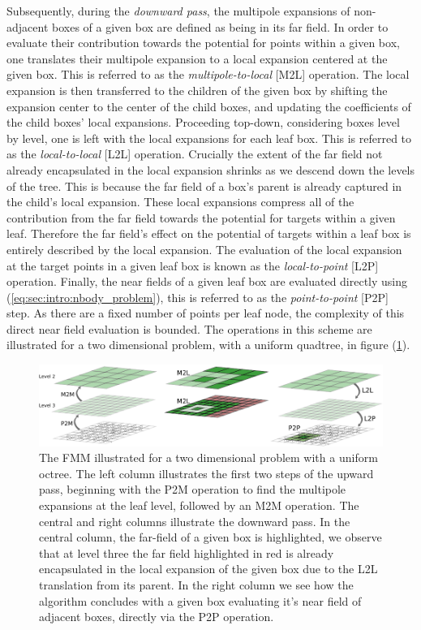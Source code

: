 \documentclass{IEEEcsmag}
\begin{document}
Subsequently, during the \textit{downward pass}, the multipole expansions of non-adjacent boxes of a given box are defined as being in its far field. In order to evaluate their contribution towards the potential for points within a given box, one translates their multipole expansion to a local expansion centered at the given box. This is referred to as the \textit{multipole-to-local} [M2L] operation. The local expansion is then transferred to the children of the given box by shifting the expansion center to the center of the child boxes, and updating the coefficients of the child boxes' local expansions. Proceeding top-down, considering boxes level by level, one is left with the local expansions for each leaf box. This is referred to as the \textit{local-to-local} [L2L] operation. Crucially the extent of the far field not already encapsulated in the local expansion shrinks as we descend down the levels of the tree. This is because the far field of a box's parent is already captured in the child's local expansion. These local expansions compress all of the contribution from the far field towards the potential for targets within a given leaf. Therefore the far field's effect on the potential of targets within a leaf box is entirely described by the local expansion. The evaluation of the local expansion at the target points in a given leaf box is known as the \textit{local-to-point} [L2P] operation. Finally, the near fields of a given leaf box are evaluated directly using (\ref{eq:sec:intro:nbody_problem}), this is referred to as the \textit{point-to-point} [P2P] step. As there are a fixed number of points per leaf node, the complexity of this direct near field evaluation is bounded. The operations in this scheme are illustrated for a two dimensional problem, with a uniform quadtree, in figure (\ref{fig:tree_traversal}).

\begin{figure}
\centerline{\includegraphics {figures/algorithm.pdf}}
\caption{The FMM illustrated for a two dimensional problem with a uniform octree. The left column illustrates the first two steps of the upward pass, beginning with the P2M operation to find the multipole expansions at the leaf level, followed by an M2M operation. The central and right columns illustrate the downward pass. In the central column, the far-field of a given box is highlighted, we observe that at level three the far field highlighted in red is already encapsulated in the local expansion of the given box due to the L2L translation from its parent. In the right column we see how the algorithm concludes with a given box evaluating it's near field of adjacent boxes, directly via the P2P operation.}
\label{fig:tree_traversal}
\end{figure}
\end{document}
